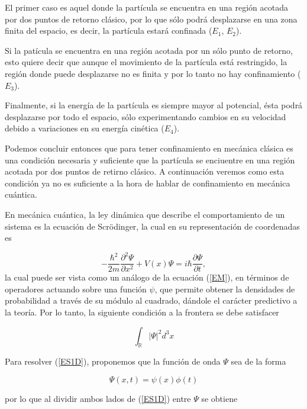 El primer caso es aquel donde la partícula se encuentra en una región acotada por dos puntos de retorno clásico, por lo que sólo podrá desplazarse en una zona finita del espacio, es decir, la partícula estará confinada ($E_1$, $E_2$).

Si la patícula se encuentra en una región acotada por un sólo punto de retorno, esto quiere decir que aunque el movimiento de la partícula está restringido, la región donde puede desplazarse no es finita y por lo tanto no hay confinamiento ($E_3$).

Finalmente, si la energía de la partícula es siempre mayor al potencial, ésta podrá desplazarse por todo el espacio, sólo experimentando cambios en su velocidad debido a variaciones en su energía cinética ($E_4$). 

Podemos concluir entonces que para tener confinamiento en mecánica clásica es una condición necesaria y suficiente que la partícula se enciuentre en una región acotada por dos puntos de retirno clásico. A continuación veremos como esta condición ya no es suficiente a la hora de hablar de confinamiento en mecánica cuántica.

 
En mecánica cuántica, la ley dinámica que describe el comportamiento de un sistema es la ecuación de Scrödinger, la cual en su representación de coordenadas es

\begin{equation}
	-\frac{\hbar^2}{2m}  \frac{\partial^2 \Psi}{\partial x^2}+ V(x) \Psi = i\hbar \frac{\partial \Psi}{\partial t}\label{ES1D},
\end{equation}
la cual puede ser vista como un análogo de la ecuación (\ref{EM}), en términos de operadores actuando sobre una función $\psi$, que permite obtener la densidades de probabilidad a través de su módulo al cuadrado, dándole el carácter predictivo a la teoría. Por lo tanto, la siguiente condición a la frontera se debe satisfacer

\begin{equation*}
	\int_{\mathbb{R}} |\Psi|^2 d^3 x \label{CFP}
\end{equation*}

Para resolver (\ref{ES1D}), proponemos que la función de onda $\Psi$ sea de la forma


\begin{equation*}
	\Psi(x,t) = \psi(x) \phi(t)
\end{equation*}

por lo que al dividir ambos lados de (\ref{ES1D}) entre $\Psi$ se obtiene

